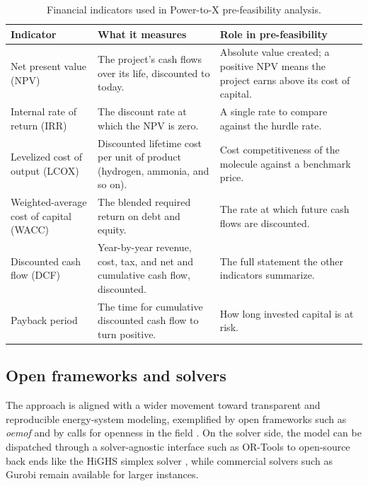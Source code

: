 \begin{table}[H]
  \centering
  \small
  \begin{tabularx}{\linewidth}{@{}>{\raggedright\arraybackslash}p{3.9cm} >{\raggedright\arraybackslash}X >{\raggedright\arraybackslash}X@{}}
    \toprule
    \textbf{Indicator} & \textbf{What it measures} & \textbf{Role in pre-feasibility} \\
    \midrule
    Net present value (NPV) & The project's cash flows over its life, discounted to
      today. & Absolute value created; a positive NPV means the project earns above
      its cost of capital. \\
    \addlinespace
    Internal rate of return (IRR) & The discount rate at which the NPV is zero. & A
      single rate to compare against the hurdle rate. \\
    \addlinespace
    Levelized cost of output (LCOX) & Discounted lifetime cost per unit of product
      (hydrogen, ammonia, and so on). & Cost competitiveness of the molecule against
      a benchmark price. \\
    \addlinespace
    Weighted-average cost of capital (WACC) & The blended required return on debt and
      equity. & The rate at which future cash flows are discounted. \\
    \addlinespace
    Discounted cash flow (DCF) & Year-by-year revenue, cost, tax, and net and
      cumulative cash flow, discounted. & The full statement the other indicators
      summarize. \\
    \addlinespace
    Payback period & The time for cumulative discounted cash flow to turn positive. &
      How long invested capital is at risk. \\
    \bottomrule
  \end{tabularx}
  \caption{Financial indicators used in Power-to-X pre-feasibility analysis.}
  \label{tab:financial-indicators}
\end{table}

\subsection{Open frameworks and solvers}

The approach is aligned with a wider movement toward transparent and reproducible
energy-system modeling, exemplified by open frameworks such as \emph{oemof}
\cite{oemof2018} and by calls for openness in the field \cite{pfenninger2018}.
On the solver side, the model can be dispatched through a solver-agnostic
interface such as OR-Tools \cite{ortools} to open-source back ends like the
HiGHS simplex solver \cite{highs2018}, while commercial solvers such as Gurobi
\cite{gurobi2024} remain available for larger instances.

